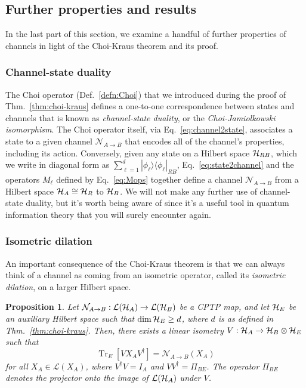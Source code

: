 \documentclass[a4paper,11pt]{article}
\newtheorem{prop}[thm]{Proposition}
\newcommand{\Eq}[1]{Eq.~\eqref{#1}}
\DeclareMathOperator{\Tr}{Tr}
\newcommand{\ketbra}[2]{| #1 \rangle \langle #2 |}
\newcommand{\Hil}{{\cal H}}
\begin{document}
\subsection{Further properties and results}

In the last part of this section, we examine a handful of further properties of channels in light of the Choi-Kraus theorem and its proof.

\subsubsection{Channel-state duality}

The Choi operator (Def.~\ref{defn:Choi}) that we introduced during the proof of Thm.~\ref{thm:choi-kraus} defines a one-to-one correspondence between states and channels that is known as \emph{channel-state duality}, or the \emph{Choi-Jamiolkowski isomorphism}.
The Choi operator itself, via \Eq{eq:channel2state}, associates a state to a given channel $\mathcal{N}_{A\rightarrow B}$ that encodes all of the channel's properties, including its action.
Conversely, given any state on a Hilbert space $\Hil_{RB}$, which we write in diagonal form as $\sum_{\ell=1}^d \ketbra{\phi_\ell}{\phi_\ell}_{RB}$, \Eq{eq:state2channel} and the operators $M_\ell$ defined by \Eq{eq:Mops} together define a channel $\mathcal{N}_{A\rightarrow B}$ from a Hilbert space $\Hil_A \cong \Hil_R$ to $\Hil_B$.
We will not make any further use of channel-state duality, but it's worth being aware of since it's a useful tool in quantum information theory that you will surely encounter again.


\subsubsection{Isometric dilation}
\label{sec:isometricdilation}

An important consequence of the Choi-Kraus theorem is that we can always think of a channel as coming from an isometric operator, called its \emph{isometric dilation}, on a larger Hilbert space.
\begin{prop}
Let $\mathcal{N}_{A \rightarrow B} : \mathcal{L}(\Hil_A) \rightarrow \mathcal{L}(\Hil_B)$ be a CPTP map, and let $\Hil_E$ be an auxiliary Hilbert space such that $\dim \Hil_E \geq d$, where $d$ is as defined in Thm.~\ref{thm:choi-kraus}.
Then, there exists a linear isometry $V : \Hil_A \rightarrow \Hil_B \otimes \Hil_E$ such that
\begin{equation}
\Tr_E[V X_A V^\dagger] = \mathcal{N}_{A \rightarrow B}(X_A)
\end{equation}
for all $X_A \in \mathcal{L}(X_A)$, where $V^\dagger V = I_A$ and $VV^\dagger = \Pi_{BE}$.
The operator $\Pi_{BE}$ denotes the projector onto the image of $\mathcal{L}(\Hil_A)$ under $V$.
\end{prop}
\end{document}
